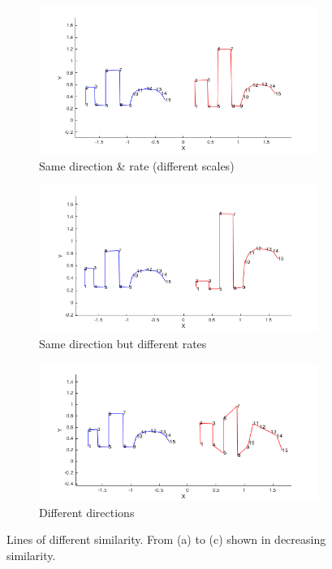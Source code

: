\documentclass[
    floatsintext
]{article}
\begin{document}
\begin{figure}[ht]
  \centering
  \begin{subfigure}{.49\textwidth}
    \includegraphics[width=1\linewidth]{./figures/similar_lines_A.png}
    \caption{Same direction \& rate (different scales)}
    \label{fig:similar_lines_A}
  \end{subfigure}
  \begin{subfigure}{.49\textwidth}
    \includegraphics[width=1\linewidth]{./figures/similar_lines_B.png}
    \caption{Same direction but different rates}
    \label{fig:similar_lines_B}
  \end{subfigure}
  \begin{subfigure}{.49\textwidth}
    \includegraphics[width=1\linewidth]{./figures/similar_lines_C.png}
    \caption{Different directions}
    \label{fig:similar_lines_C}
  \end{subfigure}
  \caption{Lines of different similarity. From (a) to (c) shown in decreasing similarity.}
\end{figure}
\end{document}
